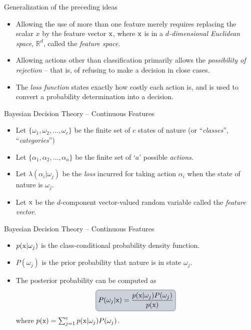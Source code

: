 \begin{frame}{Generalization of the preceding ideas}
\begin{itemize}
\setlength{\itemsep}{12pt}
\item Allowing the use of more than one feature merely requires replacing the scalar $x$ by the feature vector ${\rm x}$, where ${\rm x}$ is in a \textit{\color{mycolor1}$d$-dimensional Euclidean space}, $\mathbb{R}^d$, called the \textit{\color{mycolor1}feature space}.
\item Allowing actions other than classification primarily allows the \textit{\color{mycolor1}possibility of rejection} -- that is, of refusing to make a decision in close cases.
\item The \textit{\color{mycolor1}loss function} states exactly how costly each action is, and is used to convert a probability determination into a decision.
\end{itemize}
\end{frame}

\begin{frame}{Bayesian Decision Theory -- Continuous Features}
\begin{itemize}
\item Let $\{\omega_1,\omega_2,\ldots,\omega_c\}$ be the finite set of $c$ states of nature (or ``\textit{\color{mycolor1}classes}'', ``\textit{\color{mycolor1}categories}'')
\item Let $\{\alpha_1,\alpha_2,\ldots,\alpha_a\}$ be the finite set of `$a$' possible \textit{\color{mycolor1}actions}.
\item Let $\lambda(\alpha_i|\omega_j)$ be the \textit{\color{mycolor1}loss} incurred for taking action $\alpha_i$ when the state of nature is $\omega_j$.
\item Let ${\rm x}$ be the $d$-component vector-valued random variable called the \textit{\color{mycolor1}feature vector}.
\end{itemize}
\end{frame}

\begin{frame}{Bayesian Decision Theory -- Continuous Features}
\begin{itemize}
\setlength{\itemsep}{4pt}
\item $p({\rm x}|\omega_j)$ is the class-conditional probability density function.
\item $P(\omega_j)$ is the prior probability that nature is in state $\omega_j$.
\item The posterior probability can be computed as
\[\boxed{P(\omega_j|{\rm x})=\frac{p({\rm x}|\omega_j)P(\omega_j)}{p({\rm x})}}\]
where $p({\rm x})=\sum_{j=1}^{c}p({\rm x}|\omega_j)P(\omega_j)$.
\end{itemize}
\end{frame}

